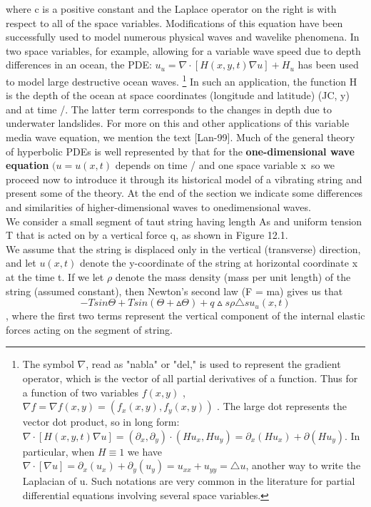 \documentclass[../main.tex]{subfiles}
\begin{document}
where c is a positive constant and the Laplace operator on the right is with respect
to all of the space variables. Modifications of this equation have been successfully
used to model numerous physical waves and wavelike phenomena. In two space
variables, for example, allowing for a variable wave speed due to depth
differences in an ocean, the PDE:
$u_u=\nabla \cdot[H(x,y,t) \nabla u] + H_u$
has been used to
model large destructive ocean waves. 
\footnote 
{ The symbol $\nabla$, read as "nabla" or "del," is used to represent the gradient operator, which is the
vector of all partial derivatives of a function. Thus for a function of two variables 
$f(x,y)$ , $\nabla f=\nabla  f(x,y)=(f_x(x,y), f_y(x,y))$
. The large dot represents the vector dot product, so in long form: 
$\nabla \cdot [H(x,y,t)\nabla u]= (\partial_x, \partial_y)\cdot (Hu_x, Hu_y)=\partial_x (Hu_x)+\partial(Hu_y)$. In particular, when  $H\equiv 1$ we have $\nabla \cdot [\nabla u]=\partial_x (u_x)+ \partial_y(u_y)=u_{xx}+u_{yy}=\triangle u $, another way to write the Laplacian of u. Such notations
are very common in the literature for partial differential equations involving several space variables.}
In such an application, the function H is the
depth of the ocean at space coordinates (longitude and latitude) (JC, y) and at time /.
The latter term corresponds to the changes in depth due to underwater landslides.
For more on this and other applications of this variable media wave equation, we
mention the text [Lan-99].
\newpage
Much of the general theory of hyperbolic PDEs is well represented by that for the \textbf{one-dimensional wave equation} $(u = u(x,t)$ depends on time / and one space
variable x\ so we proceed now to introduce it through its historical model of a
vibrating string and present some of the theory. At the end of the section we
indicate some differences and similarities of higher-dimensional waves to onedimensional waves. 
\\

We consider a small segment of taut string having length As and uniform tension
T that is acted on by a vertical force q, as shown in Figure 12.1. 
\\

We assume that the string is displaced only in the vertical (transverse) direction,
and let $u(x,t)$ denote the y-coordinate of the string at horizontal coordinate x at the
time t. If we let $\rho$ denote the mass density (mass per unit length) of the string
(assumed constant), then Newton's second law (F = ma) gives us that 
$$-T sin \Theta +T sin (\Theta +\vartriangle \Theta )+q\vartriangle s \rho \triangle su_u (x,t) $$,  
where the first two terms represent the vertical component of the internal elastic
forces acting on the segment of string.
\end{document}
